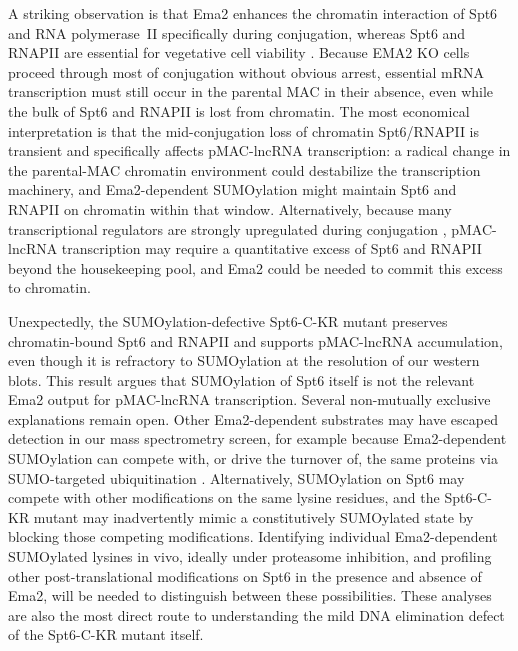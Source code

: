 \documentclass[11pt]{article}
\begin{document}
A striking observation is that Ema2 enhances the chromatin interaction of
Spt6 and RNA polymerase~II specifically during conjugation, whereas Spt6
and RNAPII are essential for vegetative cell viability
\citep{mochizuki2004rpb3}. Because EMA2 KO cells proceed through most of
conjugation without obvious arrest, essential mRNA transcription must
still occur in the parental MAC in their absence, even while the bulk of
Spt6 and RNAPII is lost from chromatin. The most economical interpretation
is that the mid-conjugation loss of chromatin Spt6/RNAPII is transient and
specifically affects pMAC-lncRNA transcription: a radical change in the
parental-MAC chromatin environment could destabilize the transcription
machinery, and Ema2-dependent SUMOylation might maintain Spt6 and RNAPII
on chromatin within that window. Alternatively, because many transcriptional
regulators are strongly upregulated during conjugation
\citep{miao2009microarray}, pMAC-lncRNA transcription may require a
quantitative excess of Spt6 and RNAPII beyond the housekeeping pool, and
Ema2 could be needed to commit this excess to chromatin.

Unexpectedly, the SUMOylation-defective Spt6-C-KR mutant preserves
chromatin-bound Spt6 and RNAPII and supports pMAC-lncRNA accumulation,
even though it is refractory to SUMOylation at the resolution of our
western blots. This result argues that SUMOylation of Spt6 itself is not
the relevant Ema2 output for pMAC-lncRNA transcription. Several non-mutually
exclusive explanations remain open. Other Ema2-dependent substrates may
have escaped detection in our mass spectrometry screen, for example because
Ema2-dependent SUMOylation can compete with, or drive the turnover of, the
same proteins via SUMO-targeted ubiquitination
\citep{praefcke2012sumo}. Alternatively, SUMOylation on Spt6 may compete
with other modifications on the same lysine residues, and the Spt6-C-KR
mutant may inadvertently mimic a constitutively SUMOylated state by
blocking those competing modifications. Identifying individual
Ema2-dependent SUMOylated lysines in vivo, ideally under proteasome
inhibition, and profiling other post-translational modifications on Spt6
in the presence and absence of Ema2, will be needed to distinguish between
these possibilities. These analyses are also the most direct route to
understanding the mild DNA elimination defect of the Spt6-C-KR mutant
itself.
\end{document}
